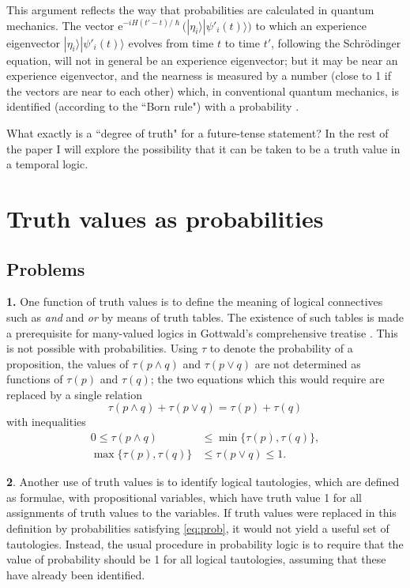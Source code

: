 \documentclass[12pt,a4paper,reqno]{article}
\renewcommand{\(}{\left(}
\renewcommand{\)}{\right)}
\newcommand{\e}{\mbox{e}}
\renewcommand{\hbar}{\hslash}
\newcommand{\<}{\langle}
\renewcommand{\>}{\rangle}
\newcommand{\be}{\begin{equation}}
\newcommand{\ee}{\end{equation}}
\theoremstyle{plain} %
\begin{document}
This argument reflects the way that probabilities are calculated in quantum mechanics.  The vector $\e^{-iH(t'-t)/\hbar}\big(|\eta_i\>|\psi'_i(t)\>\big)$ to which an experience eigenvector $|\eta_i\>|\psi'_i(t)\>$ evolves from time $t$ to time $t'$, following the Schr\"odinger equation, will not in general be an experience eigenvector; but it may be near an experience eigenvector, and the nearness is measured by a number (close to 1 if the vectors are near to each other) which, in conventional quantum mechanics, is identified (according to the ``Born rule") with a probability .
 
 What exactly is a ``degree of truth" for a future-tense statement? In the rest of the paper I will explore the possibility that it can be taken to be a truth value in a temporal logic.
 


\section{Truth values as probabilities}
\label{probtruth}

\subsection{Problems}
\label{subsec:probprobs}

{\bf 1.} One function of truth values is to define the meaning of logical connectives such as \emph{and} and \emph{or} by means of truth tables. The existence of such tables is made a prerequisite for many-valued logics in Gottwald's comprehensive treatise \cite{Gottwald:manyvalued}. This is not possible with probabilities. Using $\tau$ to denote the probability of a proposition, the values of $\tau(p\land q)$ and $\tau(p\lor q)$ are not determined as functions of $\tau(p)$ and $\tau(q)$; the two equations which this would require are replaced by a single relation
\be\label{eq:prob}
\tau(p\land q) + \tau(p\lor q) = \tau(p) + \tau(q)
\ee
with inequalities
\begin{align}\label{ineq:prob}
0 \le \tau(p\land q) &\le \min\{\tau(p),\tau(q)\},\\
\max\{\tau(p),\tau(q)\} &\le \tau(p\lor q) \le 1.
\end{align}



{\bf 2}. Another use of truth values is to identify logical tautologies, which are defined as formulae, with propositional variables, which have truth value 1 for all assignments of truth values to the variables. If truth values were replaced in this definition by probabilities satisfying \eqref{eq:prob}, it would not yield a useful set of tautologies. Instead, the usual procedure in probability logic \cite{Adams:problogic} is to require that the value of probability should be 1 for all logical tautologies, assuming that these have already been identified.
\end{document}
